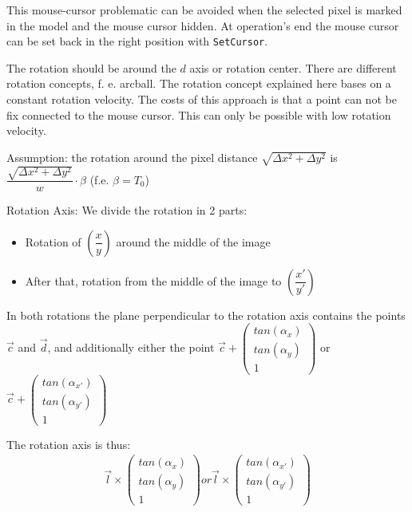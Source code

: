 \centerline{} \par  

\noindent This mouse-cursor problematic can be avoided when the selected pixel is marked in the model and the mouse cursor hidden. At operation's end the mouse cursor can be set back in the right position with \verb|SetCursor|. \newline


\noindent The rotation should be around the $d$ axis or rotation center. There are different rotation concepts, f. e. arcball. 
The rotation concept explained here bases on a constant rotation velocity.
The costs of this approach is that a point can not be fix connected to the mouse cursor. This can only be possible with low rotation velocity.

Assumption: the rotation around the pixel distance $\sqrt{\Delta x^{2} + \Delta y^{2}}$ is $\dfrac{\sqrt{\Delta x^{2} + \Delta y^{2}}}{w} \cdot \beta $ (f.e. $\beta = T_{0} $)

Rotation Axis: We divide the rotation in 2 parts:
\begin{itemize}
	\item[] Rotation of $\left(\dfrac{x}{y}\right)$ around the middle of the image
	\item[] After that, rotation from the middle of the image to $ \left(\dfrac{x'}{y'} \right)$
\end{itemize}

In both rotations the plane perpendicular to the rotation axis contains the points $\overrightarrow{c}$ and $\overrightarrow{d}$, and additionally either the point $ \overrightarrow{c} + \left(\begin{smallmatrix}tan (\alpha_{x}) \\ tan (\alpha_{y}) \\ 1\end{smallmatrix}\right) $ or $ \overrightarrow{c} + \left(\begin{smallmatrix}tan (\alpha_{x'}) \\ tan (\alpha_{y'}) \\ 1\end{smallmatrix}\right) $

The rotation axis is thus:
\begin{align*}
	& \overrightarrow{l} \times \left(\begin{smallmatrix}tan (\alpha_{x}) \\ tan (\alpha_{y}) \\ 1\end{smallmatrix}\right)  or   \overrightarrow{l} \times \left(\begin{smallmatrix}tan (\alpha_{x'}) \\ tan (\alpha_{y'}) \\ 1\end{smallmatrix}\right)  &  
\end{align*}


